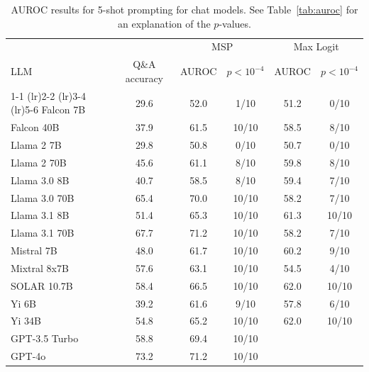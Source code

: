 \begin{table}[h]
\caption{AUROC results for 5-shot prompting for chat models. See Table~\ref{tab:auroc} for an explanation of the $p$-values.}
\label{tab:auroc_max}
\centering
\begin{tabular}{lccccc}
\toprule
& & \multicolumn{2}{c}{MSP} & \multicolumn{2}{c}{Max Logit} \\ 
LLM & Q\&A accuracy & AUROC & $p < 10^{-4}$ & AUROC & $p < 10^{-4}$ \\ 
\cmidrule(lr){1-1} \cmidrule(lr){2-2} \cmidrule(lr){3-4} \cmidrule(lr){5-6} 
Falcon 7B & 29.6 & 52.0 & 1/10 & 51.2 & 0/10\\
Falcon 40B & 37.9 & 61.5 & 10/10 & 58.5 & 8/10\\
Llama 2 7B & 29.8 & 50.8 & 0/10 & 50.7 & 0/10\\
Llama 2 70B & 45.6 & 61.1 & 8/10 & 59.8 & 8/10\\
Llama 3.0 8B & 40.7 & 58.5 & 8/10 & 59.4 & 7/10\\
Llama 3.0 70B & 65.4 & 70.0 & 10/10 & 58.2 & 7/10\\
Llama 3.1 8B & 51.4 & 65.3 & 10/10 & 61.3 & 10/10\\
Llama 3.1 70B & 67.7 & 71.2 & 10/10 & 58.2 & 7/10\\
Mistral 7B & 48.0 & 61.7 & 10/10 & 60.2 & 9/10\\
Mixtral 8x7B & 57.6 & 63.1 & 10/10 & 54.5 & 4/10\\
SOLAR 10.7B & 58.4 & 66.5 & 10/10 & 62.0 & 10/10\\
Yi 6B & 39.2 & 61.6 & 9/10 & 57.8 & 6/10\\
Yi 34B & 54.8 & 65.2 & 10/10 & 62.0 & 10/10\\
GPT-3.5 Turbo & 58.8 & 69.4 & 10/10 &  &\\
GPT-4o & 73.2 & 71.2 & 10/10 &  & \\
\bottomrule
\end{tabular}
\end{table}
